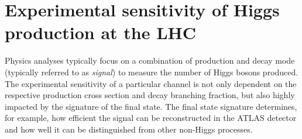 \section{Experimental sensitivity of Higgs production at the LHC}
\label{subsec:exp-accessibility}



Physics analyses typically focus on a combination of production and decay mode (typically referred to as \emph{signal}) to measure the number of Higgs bosons produced. The experimental sensitivity of a particular channel is not only dependent on the respective production cross section and decay branching fraction, but also highly impacted by the signature of the final state. The final state signature determines, for example, how efficient the signal can be reconstructed in the ATLAS detector and how well it can be distinguished from other non-Higgs processes. 

